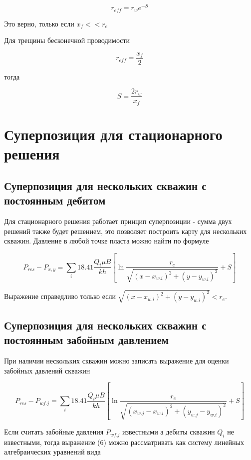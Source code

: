 \begin{equation}
	r_{eff} = r_w e^{-S}
\end{equation}

Это верно, только если $x_f << r_e$

Для трещины бесконечной проводимости 

\begin{equation}
	r_{eff} = \frac{x_f}{2}
\end{equation}

тогда 

\begin{equation}
	S = \frac{2r_w}{x_f}
\end{equation}




\section{Суперпозиция для стационарного решения}

\subsection{Суперпозиция для нескольких скважин с постоянным дебитом} 

Для стационарного решения работает принцип суперпозиции - сумма двух решений также будет решением, это позволяет построить карту для нескольких скважин.
Давление в любой точке пласта можно найти по формуле

\begin{equation}
	P_{res} - P_{x,y} =  \sum_{i} 18.41\dfrac{ Q_i\mu B }{kh} \left[ \ln\frac{r_e}{\sqrt{ (x-x_{w.i})^2 + (y-y_{w.i})^2 }} +S \right]
\end{equation}

Выражение справедливо только если $\sqrt{ (x-x_{w.i})^2 + (y-y_{w.i})^2 }< r_e$.

\subsection{Суперпозиция для нескольких скважин с постоянным забойным давлением}

При наличии нескольких скважин можно записать выражение для оценки забойных давлений скважин


$$
P_{res} - P_{wf.j} =  \sum_{i} 18.41\dfrac{ Q_i\mu B }{kh} \left[ \ln\dfrac{r_e}{\sqrt{ (x_{w.j}-x_{w.i})^2 + (y_{w.j}-y_{w.i})^2 }} +S \right]
$$

Если считать забойные давления $P_{wf.j}$ известными а дебиты скважин $Q_i$ не известными, тогда выражение (6) можно рассматривать как систему линейных алгебраических уравнений вида

